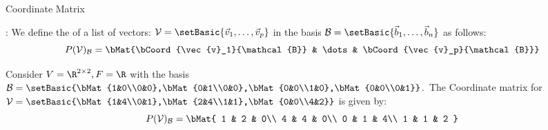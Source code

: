 \documentclass[xcoler=dvipsnames, aspectratio=169]{beamer}
\newcommand{\B}{\mathcal{B}}
\begin{document}
    \begin{frame}{Coordinate Matrix}
        \small
        \begin{defn}
            : We define the  of a list of
            vectors: $\mathcal{V}=\setBasic{\vec{v}_1,\dots,\vec{v}_p}$ in the basis $\B=\setBasic{\vec{b}_1,\dots,\vec{b}_n}$
            as follows:
            \[
                P(\mathcal{V})_\B = \bMat{\bCoord{\vec{v}_1}{\B} & \dots & \bCoord{\vec{v}_p}{\B}}
            \]
        \end{defn}\pause
        \begin{example}
            Consider $V=\R^{2\times 2},F=\R$ with the basis
            $\B=\setBasic{\bMat{1&0\\0&0},\bMat{0&1\\0&0},\bMat{0&0\\1&0},\bMat{0&0\\0&1}}$.\pause\
            The Coordinate matrix for $\mathcal{V}=\setBasic{\bMat{1&4\\0&1},\bMat{2&4\\1&1},\bMat{0&0\\4&2}}$ is given by:\pause\
            \[
                P(\mathcal{V})_\B = \bMat{
                    1 & 2 & 0\\
                    4 & 4 & 0\\
                    0 & 1 & 4\\
                    1 & 1 & 2
                }
            \]
        \end{example}
    \end{frame}
\end{document}

